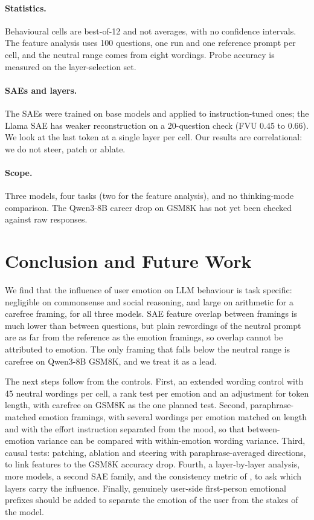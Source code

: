 \documentclass[11pt]{article}
\begin{document}
\paragraph{Statistics.} Behavioural cells are best-of-12 and not averages, with no confidence intervals. The feature analysis uses 100 questions, one run and one reference prompt per cell, and the neutral range comes from eight wordings. Probe accuracy is measured on the layer-selection set.

\paragraph{SAEs and layers.} The SAEs were trained on base models and applied to instruction-tuned ones; the Llama SAE has weaker reconstruction on a 20-question check (FVU 0.45 to 0.66). We look at the last token at a single layer per cell. Our results are correlational: we do not steer, patch or ablate.

\paragraph{Scope.} Three models, four tasks (two for the feature analysis), and no thinking-mode comparison. The Qwen3-8B career drop on GSM8K has not yet been checked against raw responses.

\section{Conclusion and Future Work}
\label{sec:future}

We find that the influence of user emotion on LLM behaviour is task specific: negligible on commonsense and social reasoning, and large on arithmetic for a carefree framing, for all three models. SAE feature overlap between framings is much lower than between questions, but plain rewordings of the neutral prompt are as far from the reference as the emotion framings, so overlap cannot be attributed to emotion. The only framing that falls below the neutral range is carefree on Qwen3-8B GSM8K, and we treat it as a lead.

The next steps follow from the controls. First, an extended wording control with 45 neutral wordings per cell, a rank test per emotion and an adjustment for token length, with carefree on GSM8K as the one planned test. Second, paraphrase-matched emotion framings, with several wordings per emotion matched on length and with the effort instruction separated from the mood, so that between-emotion variance can be compared with within-emotion wording variance. Third, causal tests: patching, ablation and steering with paraphrase-averaged directions, to link features to the GSM8K accuracy drop. Fourth, a layer-by-layer analysis, more models, a second SAE family, and the consistency metric of \citet{ye2024justice}, to ask which layers carry the influence. Finally, genuinely user-side first-person emotional prefixes should be added to separate the emotion of the user from the stakes of the model.
\end{document}

